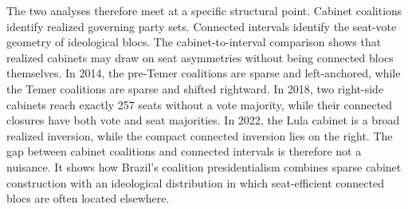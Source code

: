 \documentclass[11pt]{article}
\begin{document}
The two analyses therefore meet at a specific structural point. Cabinet
coalitions identify realized governing party sets. Connected intervals identify
the seat-vote geometry of ideological blocs. The cabinet-to-interval comparison
shows that realized cabinets may draw on seat asymmetries without being
connected blocs themselves. In 2014, the pre-Temer coalitions are sparse and
left-anchored, while the Temer coalitions are sparse and shifted rightward. In
2018, two right-side cabinets reach exactly 257 seats without a vote majority,
while their connected closures have both vote and seat majorities. In 2022, the
Lula cabinet is a broad realized inversion, while the compact connected
inversion lies on the right. The gap between cabinet coalitions and connected
intervals is therefore not a nuisance. It shows how Brazil's coalition
presidentialism combines sparse cabinet construction with an ideological
distribution in which seat-efficient connected blocs are often located elsewhere.
\end{document}
